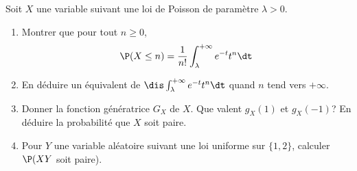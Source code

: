 \documentclass[a4paper,10pt]{report}
\begin{document}
\begin{Exa}
Soit $X$ une variable suivant une loi de Poisson de paramètre $\lambda>0$. 
\begin{enumerate}
\item Montrer que pour tout $n \geq 0$,
$$ \P(X \leq n) = \dfrac{1}{n!} \int_{\lambda}^{+ \infty} e^{-t} t^n \dt$$
\item En déduire un équivalent de $\dis \int_{\lambda}^{+ \infty} e^{-t} t^n \dt$ quand $n$ tend vers $+ \infty$.
\item Donner la fonction génératrice $G_X$ de $X$. Que valent $g_X(1)$ et $g_X(-1)$? En déduire la probabilité que $X$ soit paire.
\item Pour $Y$ une variable aléatoire suivant une loi uniforme sur $\lbrace 1,2 \rbrace$, calculer $\P(XY$ soit paire).
\end{enumerate}
\end{Exa}
\end{document}
